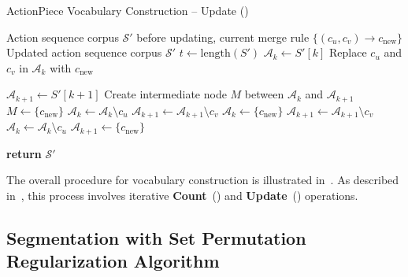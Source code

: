 \begin{algorithm}[!t]
  \caption{ActionPiece Vocabulary Construction -- Update ()}
  \label{alg:vocab_construction_update}
\begin{algorithmic}[1]
\INPUT Action sequence corpus $\mathcal{S}'$ before updating, current merge rule $\{(c_u, c_v) \to c_{\text{new}}\}$
\OUTPUT Updated action sequence corpus $\mathcal{S}'$
        \STATE $t \gets \text{length}(S')$
        \STATE $\mathcal{A}_k \gets S'[k]$
        \STATE {}
          \STATE Replace $c_u$ and $c_v$ in $\mathcal{A}_k$ with $c_{\text{new}}$
        \ENDIF
        
        \STATE {}
          \STATE $\mathcal{A}_{k+1} \gets S'[k+1]$
                \STATE Create intermediate node $M$ between $\mathcal{A}_k$ and $\mathcal{A}_{k+1}$
                \STATE $M \gets \{c_{\text{new}}\}$ 
                \STATE $\mathcal{A}_k \gets \mathcal{A}_k \setminus c_u$
                \STATE $\mathcal{A}_{k+1} \gets \mathcal{A}_{k+1} \setminus c_v$
                \STATE $\mathcal{A}_k \gets \{c_{\text{new}}\}$
                \STATE $\mathcal{A}_{k+1} \gets \mathcal{A}_{k+1} \setminus c_v$
                \STATE $\mathcal{A}_k \gets \mathcal{A}_k \setminus c_u$
                \STATE $\mathcal{A}_{k+1} \gets \{c_{\text{new}}\}$
            \ENDIF
          \ENDIF
        \ENDIF
        \ENDFOR
    \ENDFOR
\item[\textbf{return} $\mathcal{S}'$]
\end{algorithmic}
\end{algorithm}

The overall procedure for vocabulary construction is illustrated in~. As described in~, this process involves iterative \textbf{Count}~() and \textbf{Update}~() operations.


\subsection{Segmentation with Set Permutation Regularization Algorithm}

